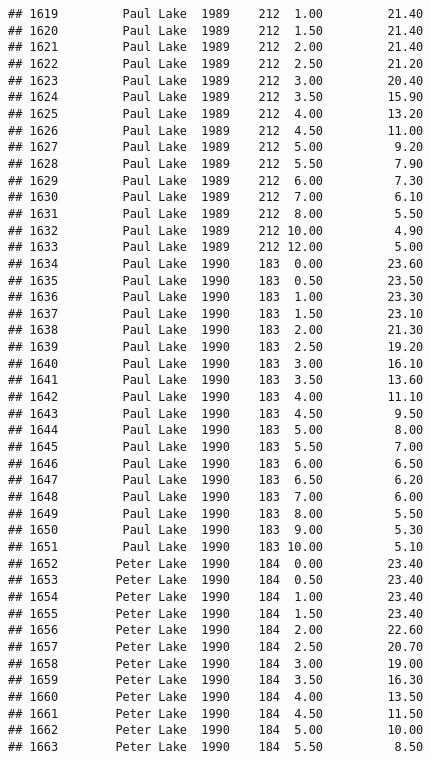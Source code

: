 \documentclass[
]{article}
\begin{document}
\begin{verbatim}
## 1619         Paul Lake  1989    212  1.00         21.40
## 1620         Paul Lake  1989    212  1.50         21.40
## 1621         Paul Lake  1989    212  2.00         21.40
## 1622         Paul Lake  1989    212  2.50         21.20
## 1623         Paul Lake  1989    212  3.00         20.40
## 1624         Paul Lake  1989    212  3.50         15.90
## 1625         Paul Lake  1989    212  4.00         13.20
## 1626         Paul Lake  1989    212  4.50         11.00
## 1627         Paul Lake  1989    212  5.00          9.20
## 1628         Paul Lake  1989    212  5.50          7.90
## 1629         Paul Lake  1989    212  6.00          7.30
## 1630         Paul Lake  1989    212  7.00          6.10
## 1631         Paul Lake  1989    212  8.00          5.50
## 1632         Paul Lake  1989    212 10.00          4.90
## 1633         Paul Lake  1989    212 12.00          5.00
## 1634         Paul Lake  1990    183  0.00         23.60
## 1635         Paul Lake  1990    183  0.50         23.50
## 1636         Paul Lake  1990    183  1.00         23.30
## 1637         Paul Lake  1990    183  1.50         23.10
## 1638         Paul Lake  1990    183  2.00         21.30
## 1639         Paul Lake  1990    183  2.50         19.20
## 1640         Paul Lake  1990    183  3.00         16.10
## 1641         Paul Lake  1990    183  3.50         13.60
## 1642         Paul Lake  1990    183  4.00         11.10
## 1643         Paul Lake  1990    183  4.50          9.50
## 1644         Paul Lake  1990    183  5.00          8.00
## 1645         Paul Lake  1990    183  5.50          7.00
## 1646         Paul Lake  1990    183  6.00          6.50
## 1647         Paul Lake  1990    183  6.50          6.20
## 1648         Paul Lake  1990    183  7.00          6.00
## 1649         Paul Lake  1990    183  8.00          5.50
## 1650         Paul Lake  1990    183  9.00          5.30
## 1651         Paul Lake  1990    183 10.00          5.10
## 1652        Peter Lake  1990    184  0.00         23.40
## 1653        Peter Lake  1990    184  0.50         23.40
## 1654        Peter Lake  1990    184  1.00         23.40
## 1655        Peter Lake  1990    184  1.50         23.40
## 1656        Peter Lake  1990    184  2.00         22.60
## 1657        Peter Lake  1990    184  2.50         20.70
## 1658        Peter Lake  1990    184  3.00         19.00
## 1659        Peter Lake  1990    184  3.50         16.30
## 1660        Peter Lake  1990    184  4.00         13.50
## 1661        Peter Lake  1990    184  4.50         11.50
## 1662        Peter Lake  1990    184  5.00         10.00
## 1663        Peter Lake  1990    184  5.50          8.50

\end{verbatim}
\end{document}
